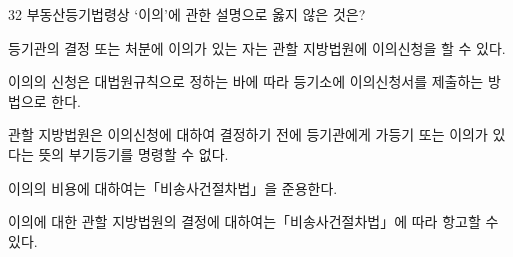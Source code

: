 \begin{question}{32}
부동산등기법령상 ‘이의’에 관한 설명으로 옳지 않은 것은?
\begin{choices}
  \item 등기관의 결정 또는 처분에 이의가 있는 자는 관할 지방법원에 이의신청을 할 수 있다.
  \item 이의의 신청은 대법원규칙으로 정하는 바에 따라 등기소에 이의신청서를 제출하는 방법으로 한다.
  \item 관할 지방법원은 이의신청에 대하여 결정하기 전에 등기관에게 가등기 또는 이의가 있다는 뜻의 부기등기를 명령할 수 없다.
  \item 이의의 비용에 대하여는「비송사건절차법」을 준용한다.
  \item 이의에 대한 관할 지방법원의 결정에 대하여는「비송사건절차법」에 따라 항고할 수 있다.
\end{choices}
\end{question}
